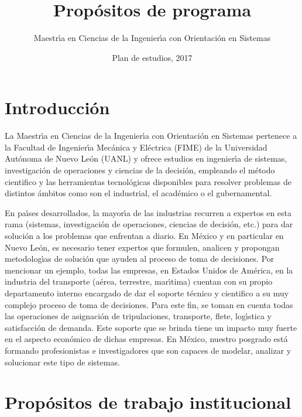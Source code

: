 \documentclass{article}
\title{Prop\'{o}sitos de programa}
\author{Maestr\'{\i}a en Ciencias de la Ingenier\'{\i}a con Orientaci\'{o}n en Sistemas}
\date{Plan de estudios, 2017}
\begin{document}
\maketitle

\section{Introducci\'{o}n}

La Maestr\'{\i}a en Ciencias de la Ingenier\'{\i}a con Orientaci\'{o}n en Sistemas
pertenece a la Facultad de Ingenier\'{\i}a Mec\'{a}nica y El\'{e}ctrica (FIME) de
la Universidad Aut\'{o}noma de Nuevo Le\'{o}n (UANL) y ofrece estudios en
ingenier\'{\i}a de sistemas, investigaci\'{o}n de operaciones y ciencias de la
decisi\'{o}n, empleando el m\'{e}todo cientifico y las herramientas
tecnol\'{o}gicas disponibles para resolver problemas de distintos \'{a}mbitos
como son el industrial, el acad\'{e}mico o el gubernamental.

En pa\'{\i}ses desarrollados, la mayor\'{\i}a de las industrias recurren a
expertos en esta rama (sistemas, investigaci\'{o}n de operaciones, ciencias
de decisi\'{o}n, etc.) para dar soluci\'{o}n a los problemas que enfrentan a
diario. En M\'{e}xico y en particular en Nuevo Le\'{o}n, es necesario tener
expertos que formulen, analicen y propongan metodolog\'{\i}as de soluci\'{o}n
que ayuden al proceso de toma de decisiones. Por mencionar un ejemplo,
todas las empresas, en Estados Unidos de Am\'{e}rica, en la industria del
transporte (a\'{e}rea, terrestre, mar\'{\i}tima) cuentan con su propio
departamento interno encargado de dar el soporte t\'{e}cnico y cientifico a
su muy complejo proceso de toma de decisiones. Para este fin, se toman
en cuenta todas las operaciones de asignaci\'{o}n de tripulaciones,
transporte, flete, log\'{\i}stica y satisfacci\'{o}n de demanda. Este soporte
que se brinda tiene un impacto muy fuerte en el aspecto econ\'{o}mico de
dichas empresas. En M\'{e}xico, nuestro posgrado est\'{a} formando
profesionistas e investigadores que son capaces de modelar, analizar y
solucionar este tipo de sistemas.

\section{Prop\'{o}sitos de trabajo institucional}
\end{document}
